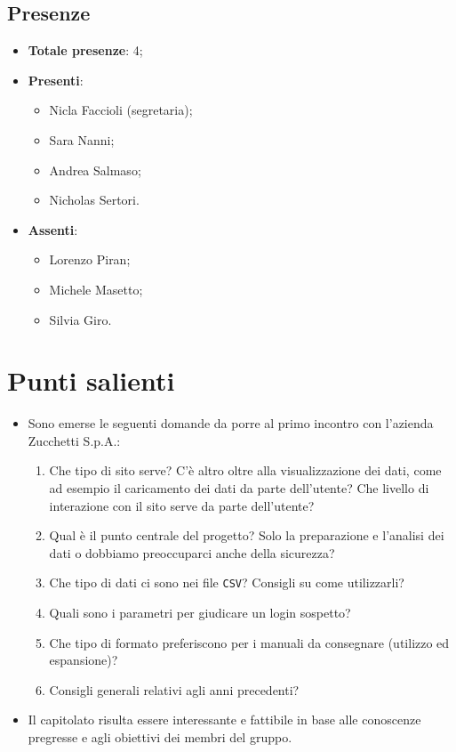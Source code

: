 \documentclass[11pt]{article}
\begin{document}
	\subsection{Presenze}
	\begin{itemize}
		\item \textbf{Totale presenze}: 4;
		\item \textbf{Presenti}:
		\begin{itemize}
			\item Nicla Faccioli (segretaria);
			\item Sara Nanni;
			\item Andrea Salmaso;
			\item Nicholas Sertori.
		\end{itemize}
		\item \textbf{Assenti}:
		\begin{itemize}
			\item Lorenzo Piran;
			\item Michele Masetto;
			\item Silvia Giro.
		\end{itemize}
	\end{itemize}

	\newpage

	\section{Punti salienti}
		\begin{itemize}
			\item Sono emerse le seguenti domande da porre al primo incontro con l'azienda Zucchetti S.p.A.:
			\begin{enumerate}
				\item Che tipo di sito serve?
				C'è altro oltre alla visualizzazione dei dati, come ad esempio il caricamento dei dati da parte dell'utente?
				Che livello di interazione con il sito serve da parte dell'utente?
				\item Qual è il punto centrale del progetto?
				Solo la preparazione e l'analisi dei dati o dobbiamo preoccuparci anche della sicurezza?
				\item Che tipo di dati ci sono nei file \texttt{CSV}? Consigli su come utilizzarli?
				\item Quali sono i parametri per giudicare un login sospetto?
				\item Che tipo di formato preferiscono per i manuali da consegnare (utilizzo ed espansione)?
				\item Consigli generali relativi agli anni precedenti?
			\end{enumerate}
			\item Il capitolato risulta essere interessante e fattibile in base alle conoscenze pregresse e agli
			obiettivi dei membri del gruppo.
		\end{itemize}
		
\end{document}
